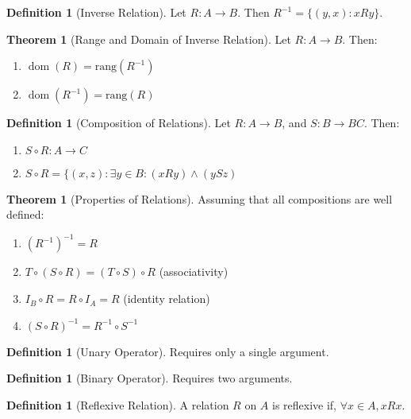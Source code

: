 \documentclass[10pt]{article}
\theoremstyle{definition}
\newtheorem{definition}[equation]{Definition}
\newtheorem{theorem}[equation]{Theorem}
\DeclareMathOperator\dom{dom}
\begin{document}
\begin{definition}[Inverse Relation]
  Let $R:A\rightarrow B$. Then $R^{-1} = \{(y,x): xRy\}$.
\end{definition}

\begin{theorem}[Range and Domain of Inverse Relation]
  Let $R:A\rightarrow B$. Then:
  \begin{enumerate}
    \item $\dom(R) = \text{rang}(R^{-1})$
    \item $\dom(R^{-1}) = \text{rang}(R)$
  \end{enumerate}
\end{theorem}

\begin{definition}[Composition of Relations]
  Let $R:A\rightarrow B$, and $S:B\rightarrow BC$. Then:
  \begin{enumerate}
    \item $S\circ R: A\rightarrow C$
    \item $S\circ R=\{(x,z): \exists y\in B: (xRy) \land (ySz)$
  \end{enumerate}
\end{definition}

\begin{theorem}[Properties of Relations]
  Assuming that all compositions are well defined:
  \begin{enumerate}
    \item $(R^{-1})^{-1} = R$
    \item $T\circ (S\circ R) = (T\circ S)\circ R$ (associativity)
    \item $I_B \circ R = R \circ I_A = R$ (identity relation)
    \item $(S\circ R)^{-1} = R^{-1} \circ S^{-1}$
  \end{enumerate}
\end{theorem}

\begin{definition}[Unary Operator]
  Requires only a single argument.
\end{definition}

\begin{definition}[Binary Operator]
  Requires two arguments.
\end{definition}

\begin{definition}[Reflexive Relation]
  A relation $R$ on $A$ is reflexive if, $\forall x\in A, xRx$.
\end{definition}
\end{document}
